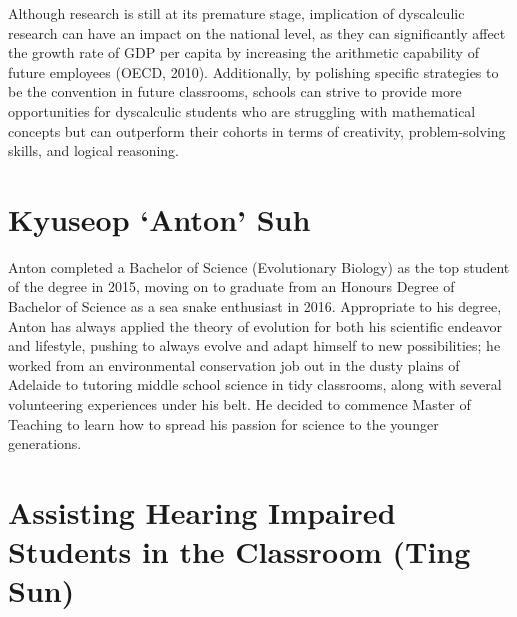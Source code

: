 \documentclass[twoside,12pt,a4paper,notitlepage]{memoir}
\begin{document}
Although research is still at its premature stage, implication of dyscalculic research can have an impact on the national level, as they can significantly affect the growth rate of GDP per capita by increasing the arithmetic capability of future employees (OECD, 2010). Additionally, by polishing specific strategies to be the convention in future classrooms, schools can strive to provide more opportunities for dyscalculic students who are struggling with mathematical concepts but can outperform their cohorts in terms of creativity, problem-solving skills, and logical reasoning.

\section*{Kyuseop `Anton' Suh}

Anton completed a Bachelor of Science (Evolutionary Biology) as the top student of the degree in 2015, moving on to graduate from an Honours Degree of Bachelor of Science as a sea snake enthusiast in 2016. Appropriate to his degree, Anton has always applied the theory of evolution for both his scientific endeavor and lifestyle, pushing to always evolve and adapt himself to new possibilities; he worked from an environmental conservation job out in the dusty plains of Adelaide to tutoring middle school science in tidy classrooms, along with several volunteering experiences under his belt. He decided to commence Master of Teaching to learn how to spread his passion for science to the younger generations.



\pagebreak
\section*{Assisting Hearing Impaired Students in the Classroom (Ting Sun)}
\label{aut:sun}
\end{document}
